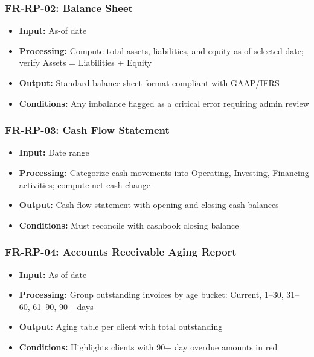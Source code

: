 \documentclass[journal, a4paper, onecolumn, 12pt]{IEEEtran}
\begin{document}
\subsubsection{FR-RP-02: Balance Sheet}
\begin{itemize}[leftmargin=*]
\item \textbf{Input:} As-of date
\item \textbf{Processing:} Compute total assets, liabilities, and equity as of selected date; verify Assets = Liabilities + Equity
\item \textbf{Output:} Standard balance sheet format compliant with GAAP/IFRS
\item \textbf{Conditions:} Any imbalance flagged as a critical error requiring admin review
\end{itemize}

\subsubsection{FR-RP-03: Cash Flow Statement}
\begin{itemize}[leftmargin=*]
\item \textbf{Input:} Date range
\item \textbf{Processing:} Categorize cash movements into Operating, Investing, Financing activities; compute net cash change
\item \textbf{Output:} Cash flow statement with opening and closing cash balances
\item \textbf{Conditions:} Must reconcile with cashbook closing balance
\end{itemize}

\subsubsection{FR-RP-04: Accounts Receivable Aging Report}
\begin{itemize}[leftmargin=*]
\item \textbf{Input:} As-of date
\item \textbf{Processing:} Group outstanding invoices by age bucket: Current, 1–30, 31–60, 61–90, 90+ days
\item \textbf{Output:} Aging table per client with total outstanding
\item \textbf{Conditions:} Highlights clients with 90+ day overdue amounts in red
\end{itemize}
\end{document}
